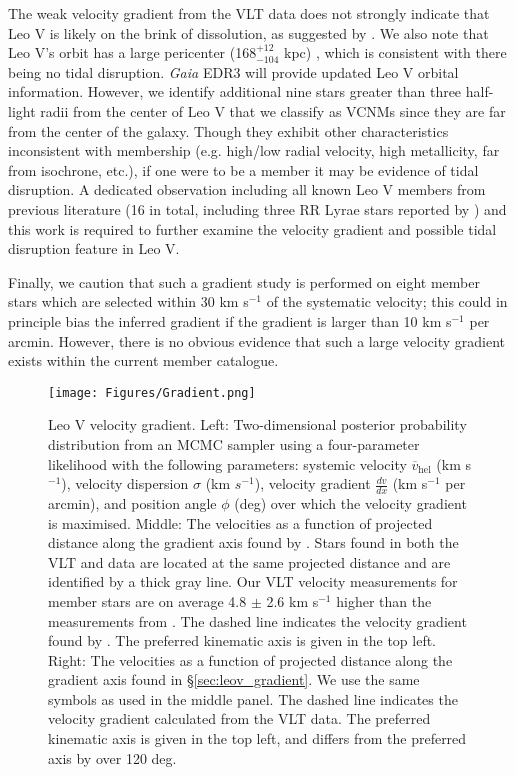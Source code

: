 \documentclass[twocolumn]{aastex63}
\begin{document}
The weak velocity gradient from the VLT data does not strongly indicate that Leo V is likely on the brink of dissolution, as suggested by \citet{col2017}. We also note that Leo V's orbit has a large pericenter (168$^{+12}_{-104}$ kpc) \citep{fri2018}, which is consistent with there being no tidal disruption. {\it Gaia} EDR3 will provide updated Leo V orbital information.
However, we identify additional nine stars greater than three half-light radii from the center of Leo V that we classify as VCNMs since they are far from the center of the galaxy. Though they exhibit other characteristics inconsistent with membership (e.g. high/low radial velocity, high metallicity, far from isochrone, etc.), if one were to be a member it may be evidence of tidal disruption. A dedicated observation including all known Leo V members  from previous literature (16 in total, including three RR Lyrae stars reported by \citet{med2017}) and this work is required to further examine the velocity gradient and possible tidal disruption feature in Leo V.

Finally, we caution that such a gradient study is performed on eight member stars which are selected  within 30 km s$^{-1}$ of the systematic velocity; this could in principle bias the inferred gradient if the gradient is larger than 10 km s$^{-1}$ per arcmin. However, there is no obvious evidence that such a large velocity gradient exists within the current member catalogue.


\begin{figure*}
\centering
\texttt{[image: Figures/Gradient.png]}
\caption{Leo V velocity gradient. Left: Two-dimensional posterior probability distribution from an MCMC sampler using a four-parameter likelihood with the following parameters: systemic velocity $\overline{v}_\mathrm{hel}$ (km s$^{-1}$), velocity dispersion $\sigma$ (km $s^{-1}$), velocity gradient $\frac{dv}{dx}$ (km s$^{-1}$ per arcmin), and position angle $\phi$ (deg) over which the velocity gradient is maximised. Middle: The velocities as a function of projected distance along the gradient axis found by \citet{col2017}. Stars found in both the VLT and \citet{col2017} data are located at the same projected distance and are identified by a thick gray line. Our VLT velocity measurements for member stars are on average 4.8 $\pm$ 2.6 km s$^{-1}$ higher than the measurements from \citet{col2017}. The dashed line indicates the velocity gradient found by \citet{col2017}. The preferred kinematic axis is given in the top left. Right: The velocities as a function of projected distance along the gradient axis found in \S\ref{sec:leov_gradient}. We use the same symbols as used in the middle panel. The dashed line indicates the velocity gradient calculated from the VLT data. The preferred kinematic axis is given in the top left, and differs from the \citet{col2017} preferred axis by over 120 deg. 
  \label{vgradient}}
\end{figure*}
\end{document}
